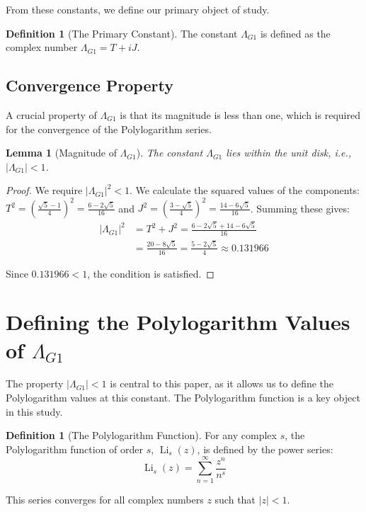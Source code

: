 \documentclass{amsart}
\theoremstyle{plain}
\newtheorem{lemma}[theorem]{Lemma}
\theoremstyle{definition}
\newtheorem{definition}[theorem]{Definition}
\theoremstyle{remark}
\DeclareMathOperator{\Li}{Li} %
\newcommand{\LambdaG}{\Lambda_{G1}}
\begin{document}
From these constants, we define our primary object of study.
\begin{definition}[The Primary Constant]
The constant $\LambdaG$ is defined as the complex number $\LambdaG = T+iJ$.
\end{definition}

\subsection{Convergence Property}
A crucial property of $\LambdaG$ is that its magnitude is less than one, which is required for the convergence of the Polylogarithm series.
\begin{lemma}[Magnitude of $\LambdaG$]
\label{lem:convergence}
The constant $\LambdaG$ lies within the unit disk, i.e., $|\LambdaG| < 1$.
\end{lemma}
\begin{proof}
We require $|\LambdaG|^2 < 1$. We calculate the squared values of the components: $T^2 = \left(\frac{\sqrt{5}-1}{4}\right)^2 = \frac{6-2\sqrt{5}}{16}$ and $J^2 = \left(\frac{3-\sqrt{5}}{4}\right)^2 = \frac{14-6\sqrt{5}}{16}$. Summing these gives:
\begin{align*}
    |\LambdaG|^2 &= T^2+J^2 = \frac{6-2\sqrt{5} + 14-6\sqrt{5}}{16} \\
                 &= \frac{20-8\sqrt{5}}{16} = \frac{5-2\sqrt{5}}{4} \approx 0.131966
\end{align*}

Since $0.131966 < 1$, the condition is satisfied.
\qedhere
\end{proof}

\section{Defining the Polylogarithm Values of \texorpdfstring{$\LambdaG$}{Lambda\_G1}}
The property $|\LambdaG| < 1$ is central to this paper, as it allows us to define the Polylogarithm values at this constant. The Polylogarithm function is a key object in this study.
\begin{definition}[The Polylogarithm Function]
For any complex $s$, the Polylogarithm function of order $s$, $\Li_s(z)$, is defined by the power series:
$$ \Li_s(z) = \sum_{n=1}^{\infty} \frac{z^n}{n^s} $$

This series converges for all complex numbers $z$ such that $|z|<1$.
\end{definition}
\end{document}
